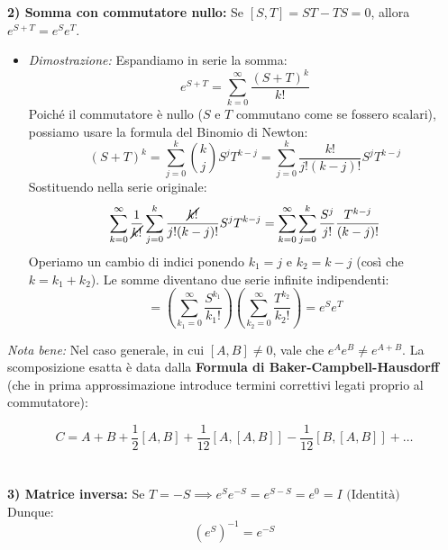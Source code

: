 \documentclass[openany]{book}
\theoremstyle{definition}
\theoremstyle{remark}
\begin{document}
\textbf{2) Somma con commutatore nullo:} Se $[S, T] = ST - TS = 0$, allora $e^{S+T} = e^S e^T$.
\begin{itemize}
    \item[] \textit{Dimostrazione:} Espandiamo in serie la somma:
    \begin{equation*}
        e^{S+T} = \sum_{k=0}^{\infty} \frac{(S+T)^k}{k!}
    \end{equation*}
    Poiché il commutatore è nullo ($S$ e $T$ commutano come se fossero scalari), possiamo usare la formula del Binomio di Newton: 
    \begin{equation*}
        (S+T)^k = \sum_{j=0}^{k} \binom{k}{j} S^j T^{k-j} = \sum_{j=0}^{k} \frac{k!}{j!(k-j)!} S^j T^{k-j}
    \end{equation*}
    Sostituendo nella serie originale:
    \begin{equation*}
        \sum_{k=0}^{\infty} \frac{1}{\cancel{k!}} \sum_{j=0}^{k} \frac{\cancel{k!}}{j!(k-j)!} S^j T^{k-j} = \sum_{k=0}^{\infty} \sum_{j=0}^{k} \frac{S^j}{j!} \frac{T^{k-j}}{(k-j)!}
    \end{equation*}
    Operiamo un cambio di indici ponendo $k_1 = j$ e $k_2 = k-j$ (così che $k = k_1 + k_2$). Le somme diventano due serie infinite indipendenti:
    \begin{equation*}
        = \left( \sum_{k_1=0}^{\infty} \frac{S^{k_1}}{k_1!} \right) \left( \sum_{k_2=0}^{\infty} \frac{T^{k_2}}{k_2!} \right) = e^S e^T
    \end{equation*}
\end{itemize}
\textit{Nota bene:} Nel caso generale, in cui $[A, B] \neq 0$, vale che $e^A e^B \neq e^{A+B}$. La scomposizione esatta è data dalla \textbf{Formula di Baker-Campbell-Hausdorff} (che in prima approssimazione introduce termini correttivi legati proprio al commutatore):




\begin{equation*}
    C = A + B + \frac{1}{2}[A,B] + \frac{1}{12}[A,[A,B]] - \frac{1}{12}[B,[A,B]] + \dots
\end{equation*}
\\
\\
\textbf{3) Matrice inversa:} Se $T = -S \implies e^S e^{-S} = e^{S-S} = e^0 = I \text{ (Identità)}$ \\
Dunque:
\begin{equation*}
    (e^S)^{-1} = e^{-S}
\end{equation*}
\end{document}
